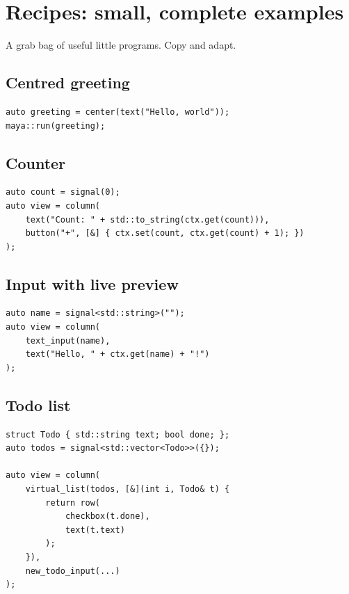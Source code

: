 \chapter{Recipes: small, complete examples}
\label{ch:recipes}

\begin{aside}
A grab bag of useful little programs. Copy and adapt.
\end{aside}

\section{Centred greeting}

\begin{lstlisting}
auto greeting = center(text("Hello, world"));
maya::run(greeting);
\end{lstlisting}

\section{Counter}

\begin{lstlisting}
auto count = signal(0);
auto view = column(
    text("Count: " + std::to_string(ctx.get(count))),
    button("+", [&] { ctx.set(count, ctx.get(count) + 1); })
);
\end{lstlisting}

\section{Input with live preview}

\begin{lstlisting}
auto name = signal<std::string>("");
auto view = column(
    text_input(name),
    text("Hello, " + ctx.get(name) + "!")
);
\end{lstlisting}

\section{Todo list}

\begin{lstlisting}
struct Todo { std::string text; bool done; };
auto todos = signal<std::vector<Todo>>({});

auto view = column(
    virtual_list(todos, [&](int i, Todo& t) {
        return row(
            checkbox(t.done),
            text(t.text)
        );
    }),
    new_todo_input(...)
);
\end{lstlisting}

